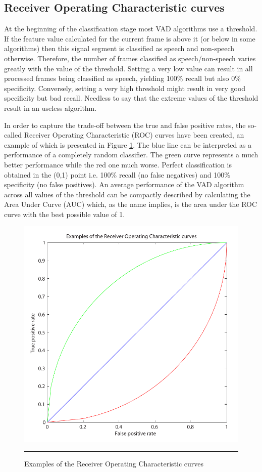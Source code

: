 \subsection{Receiver Operating Characteristic curves}

At the beginning of the classification stage most VAD algorithms use a threshold. If the feature value calculated for the current frame is above it (or below in some algorithms) then this signal segment is classified as speech and non-speech otherwise. Therefore, the number of frames classified as speech/non-speech varies greatly with the value of the threshold. Setting a very low value can result in all processed frames being classified as speech, yielding 100\% recall but also 0\% specificity. Conversely, setting a very high threshold might result in very good specificity but bad recall. Needless to say that the extreme values of the threshold result in an useless algorithm.

In order to capture the trade-off between the true and false positive rates, the so-called Receiver Operating Characteristic (ROC) curves have been created, an example of which is presented in Figure \ref{fig:roc}. The blue line can be interpreted as a performance of a completely random classifier. The green curve represents a much better performance while the red one much worse. Perfect classification is obtained in the (0,1) point i.e. 100\% recall (no false negatives) and 100\% specificity (no false positives). An average performance of the VAD algorithm across all values of the threshold can be compactly described by calculating the Area Under Curve (AUC) which, as the name implies, is the area under the ROC curve with the best possible value of 1.

\begin{figure}[htbp]
	\centering
		\includegraphics[width=0.55\columnwidth]{Figures/Chapter4/roc.pdf}
		\rule{37em}{0.5pt}
	\caption[Examples of the Receiver Operating Characteristic curves]{Examples of the Receiver Operating Characteristic curves}
	\label{fig:roc}
\end{figure}

